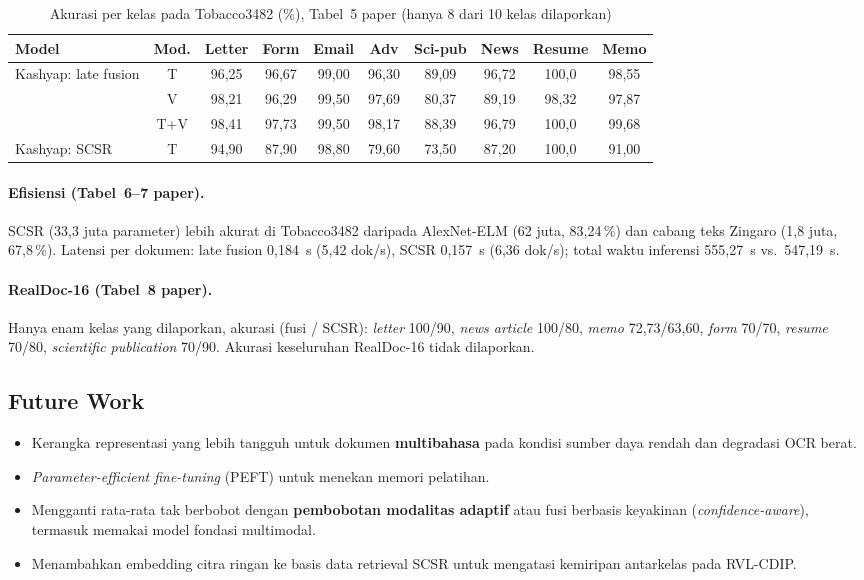 \begin{table}[H]
  \centering
  \caption{Akurasi per kelas pada Tobacco3482 (\%), Tabel~5 paper (hanya 8 dari 10 kelas dilaporkan)}
  \label{tab:kas-kelas}
  \fontsize{9}{11}\selectfont
  \setlength\tabcolsep{4pt}
  \begin{tabular}{|l|c|c|c|c|c|c|c|c|c|}
    \hline
    \textbf{Model} & \textbf{Mod.} & Letter & Form & Email & Adv & Sci-pub & News & Resume & Memo \\ \hline
    \multirow{3}{*}{Kashyap: late fusion} & T & 96,25 & 96,67 & 99,00 & 96,30 & 89,09 & 96,72 & 100,0 & 98,55 \\
     & V & 98,21 & 96,29 & 99,50 & 97,69 & 80,37 & 89,19 & 98,32 & 97,87 \\
     & T+V & 98,41 & 97,73 & 99,50 & 98,17 & 88,39 & 96,79 & 100,0 & 99,68 \\ \hline
    Kashyap: SCSR & T & 94,90 & 87,90 & 98,80 & 79,60 & 73,50 & 87,20 & 100,0 & 91,00 \\ \hline
  \end{tabular}
\end{table}

\paragraph{Efisiensi (Tabel~6--7 paper).} SCSR (33,3 juta parameter) lebih akurat di
Tobacco3482 daripada AlexNet-ELM (62 juta, 83,24\,\%) dan cabang teks Zingaro (1,8 juta,
67,8\,\%). Latensi per dokumen: late fusion 0,184~s (5,42 dok/s), SCSR 0,157~s
(6,36 dok/s); total waktu inferensi 555,27~s vs.\ 547,19~s.

\paragraph{RealDoc-16 (Tabel~8 paper).} Hanya enam kelas yang dilaporkan, akurasi
(fusi / SCSR): \emph{letter} 100/90, \emph{news article} 100/80, \emph{memo} 72,73/63,60,
\emph{form} 70/70, \emph{resume} 70/80, \emph{scientific publication} 70/90. Akurasi
keseluruhan RealDoc-16 tidak dilaporkan.

\subsection{Future Work}
\begin{itemize}
  \item Kerangka representasi yang lebih tangguh untuk dokumen \textbf{multibahasa} pada
        kondisi sumber daya rendah dan degradasi OCR berat.
  \item \emph{Parameter-efficient fine-tuning} (PEFT) untuk menekan memori pelatihan.
  \item Mengganti rata-rata tak berbobot dengan \textbf{pembobotan modalitas adaptif} atau
        fusi berbasis keyakinan (\emph{confidence-aware}), termasuk memakai model fondasi
        multimodal.
  \item Menambahkan embedding citra ringan ke basis data retrieval SCSR untuk mengatasi
        kemiripan antarkelas pada RVL-CDIP.
\end{itemize}

